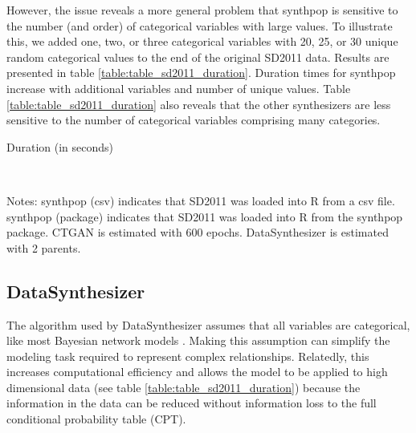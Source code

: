 \documentclass[runningheads]{llncs}
\begin{document}
However, the issue reveals a more general problem that synthpop is sensitive to the number (and order) of categorical variables with large values.  To illustrate this, we added one, two, or three categorical variables with 20, 25, or 30 unique random categorical values to the end of the original SD2011 data.  Results are presented in table \ref{table:table_sd2011_duration}. Duration times for synthpop increase with additional variables and number of unique values.  Table \ref{table:table_sd2011_duration} also reveals that the other synthesizers are less sensitive to the number of categorical variables comprising many categories.


\begin{table}
    \centering
    \caption{Duration (in seconds)}
    \resizebox{\textwidth}{!}{}
    \label{table:table_sd2011_duration}
    \\
    \raggedright
    \tiny{Notes: synthpop (csv) indicates that SD2011 was loaded into R from a csv file.  synthpop (package) indicates that SD2011 was loaded into R from the synthpop package.  CTGAN is estimated with 600 epochs.  DataSynthesizer is estimated with 2 parents.}
\end{table}

\subsection{DataSynthesizer}\label{subsec:know_your_generator_datasynthesizer}

The algorithm used by DataSynthesizer assumes that all variables are categorical, like most Bayesian network models \cite{young2009using}.  Making this assumption can simplify the modeling task required to represent complex relationships.  Relatedly, this increases computational efficiency and allows the model to be applied to high dimensional data (see table \ref{table:table_sd2011_duration}) because the information in the data can be reduced without information loss to the full conditional probability table (CPT). 
\end{document}
